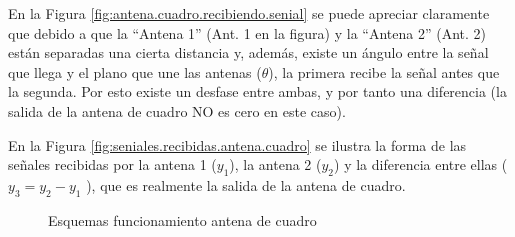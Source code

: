 En la Figura \ref{fig:antena.cuadro.recibiendo.senial} se puede apreciar claramente que debido a que la ``Antena 1'' (Ant. 1 en la figura) y la ``Antena 2'' (Ant. 2) est\'an separadas una cierta distancia y, adem\'as, existe un \'angulo entre la se\~nal que llega y el plano que une las antenas ($\theta$), la primera recibe la se\~nal antes que la segunda. Por esto existe un desfase entre ambas, y por tanto una diferencia (la salida de la antena de cuadro NO es cero en este caso).

 En la Figura \ref{fig:seniales.recibidas.antena.cuadro} se ilustra la forma de las se\~nales recibidas por la antena 1 ($y_1$), la antena 2 ($y_2$) y la diferencia entre ellas ( $y_3 = y_2 - y_1$ ), que es realmente la salida de la antena de cuadro.

\begin{figure}[!h]
  \centering

  \caption{Esquemas funcionamiento antena de cuadro}
\end{figure}


